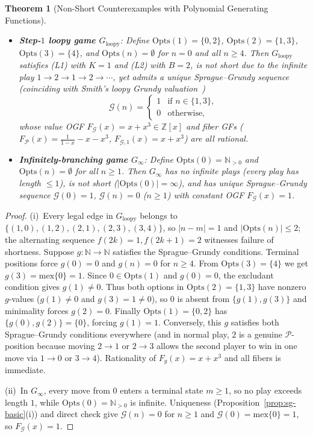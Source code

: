 \documentclass[11pt]{article}
\newtheorem{theorem}{Theorem}[section]
\theoremstyle{definition}
\theoremstyle{remark}
\newcommand{\N}{\mathbb{N}}
\newcommand{\Z}{\mathbb{Z}}
\newcommand{\G}{\mathcal{G}}
\newcommand{\Ppos}{\mathcal{P}}
\newcommand{\mex}{\mathrm{mex}}
\newcommand{\Opts}{\mathrm{Opts}}
\begin{document}
\begin{theorem}[Non-Short Counterexamples with Polynomial Generating Functions]
\label{thm:necessity-short}
\leavevmode
\begin{itemize}
  \item[\textup{(i)}] \textbf{Step-$1$ loopy game $G_{\mathrm{loopy}}$}: Define $\Opts(1)=\{0,2\}$, $\Opts(2)=\{1,3\}$, $\Opts(3)=\{4\}$, and $\Opts(n)=\emptyset$ for $n=0$ and all $n \ge 4$. Then $G_{\mathrm{loopy}}$ satisfies \textup{(L1)} with $K=1$ and \textup{(L2)} with $B=2$, is \emph{not short} due to the infinite play $1 \to 2 \to 1 \to 2 \to \cdots$, yet admits a unique Sprague--Grundy sequence (coinciding with Smith's loopy Grundy valuation~\cite{Smith1966})
  \[
    \G(n) = \begin{cases} 1 & \text{if } n \in \{1,3\}, \\ 0 & \text{otherwise,} \end{cases}
  \]
  whose value OGF $F_{\G}(x) = x + x^3 \in \Z[x]$ and fiber GFs ($F_{\Ppos}(x) = \frac{1}{1-x} - x - x^3$, $F_{\G,1}(x) = x + x^3$) are all rational.
  \item[\textup{(ii)}] \textbf{Infinitely-branching game $G_{\infty}$}: Define $\Opts(0) = \N_{>0}$ and $\Opts(n) = \emptyset$ for all $n \ge 1$. Then $G_{\infty}$ has no infinite plays (every play has length $\le 1$), is \emph{not short} ($|\Opts(0)| = \infty$), and has unique Sprague--Grundy sequence $\G(0)=1$, $\G(n)=0$ ($n \ge 1$) with constant OGF $F_{\G}(x) = 1$.
\end{itemize}
\end{theorem}
\begin{proof}
(i)~Every legal edge in $G_{\mathrm{loopy}}$ belongs to $\{(1,0),(1,2),(2,1),(2,3),(3,4)\}$, so $|n-m|=1$ and $|\Opts(n)| \le 2$; the alternating sequence $f(2k)=1, f(2k+1)=2$ witnesses failure of shortness. Suppose $g : \N \to \N$ satisfies the Sprague--Grundy conditions. Terminal positions force $g(0)=0$ and $g(n)=0$ for $n \ge 4$. From $\Opts(3)=\{4\}$ we get $g(3)=\mex\{0\}=1$. Since $0 \in \Opts(1)$ and $g(0)=0$, the excludant condition gives $g(1) \neq 0$. Thus both options in $\Opts(2)=\{1,3\}$ have nonzero $g$-values ($g(1) \neq 0$ and $g(3)=1 \neq 0$), so $0$ is absent from $\{g(1),g(3)\}$ and minimality forces $g(2)=0$. Finally $\Opts(1)=\{0,2\}$ has $\{g(0),g(2)\}=\{0\}$, forcing $g(1)=1$. Conversely, this $g$ satisfies both Sprague--Grundy conditions everywhere (and in normal play, $2$ is a genuine $\Ppos$-position because moving $2 \to 1$ or $2 \to 3$ allows the second player to win in one move via $1 \to 0$ or $3 \to 4$). Rationality of $F_g(x) = x + x^3$ and all fibers is immediate.

(ii)~In $G_{\infty}$, every move from $0$ enters a terminal state $m \ge 1$, so no play exceeds length $1$, while $\Opts(0)=\N_{>0}$ is infinite. Uniqueness (Proposition~\ref{prop:sg-basic}(i)) and direct check give $\G(n)=0$ for $n \ge 1$ and $\G(0)=\mex\{0\}=1$, so $F_{\G}(x)=1$.
\end{proof}
\end{document}
